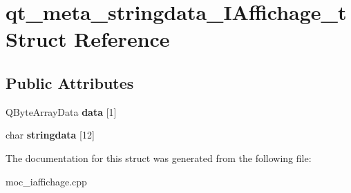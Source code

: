 \hypertarget{structqt__meta__stringdata__IAffichage__t}{\section{qt\+\_\+meta\+\_\+stringdata\+\_\+\+I\+Affichage\+\_\+t Struct Reference}
\label{structqt__meta__stringdata__IAffichage__t}
}
\subsection*{Public Attributes}
\begin{DoxyCompactItemize}
\item 
\hypertarget{structqt__meta__stringdata__IAffichage__t_a657597828cc58e47411787993af24b1f}{Q\+Byte\+Array\+Data {\bfseries data} \mbox{[}1\mbox{]}}\label{structqt__meta__stringdata__IAffichage__t_a657597828cc58e47411787993af24b1f}

\item 
\hypertarget{structqt__meta__stringdata__IAffichage__t_a2c0d8bb42829e61fe97cb8e399594d28}{char {\bfseries stringdata} \mbox{[}12\mbox{]}}\label{structqt__meta__stringdata__IAffichage__t_a2c0d8bb42829e61fe97cb8e399594d28}

\end{DoxyCompactItemize}


The documentation for this struct was generated from the following file\+:\begin{DoxyCompactItemize}
\item 
moc\+\_\+iaffichage.\+cpp\end{DoxyCompactItemize}
